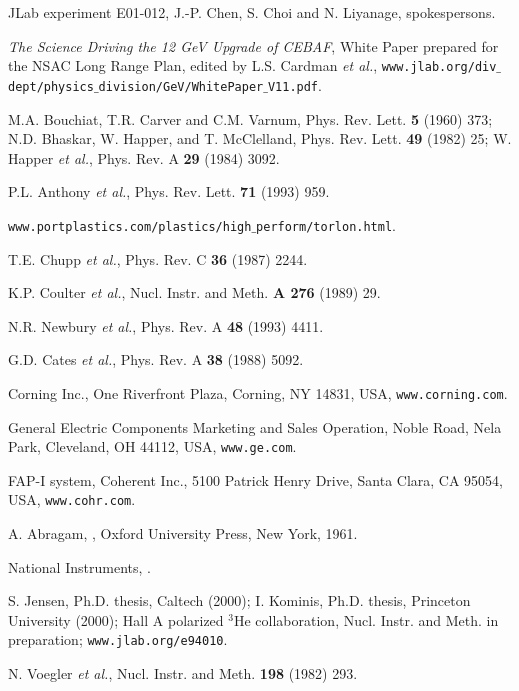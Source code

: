 \begin{thebibliography}{99}
 JLab experiment E01-012,
\newblock J.-P. Chen, S. Choi and N. Liyanage, spokespersons.

 {\it The Science Driving the 12 GeV Upgrade of CEBAF},
\newblock White Paper prepared for the NSAC Long Range Plan, edited by L.S. 
Cardman {\em et al.}, {\tt www.jlab.org/div$\_$dept/physics$\_$division/GeV/WhitePaper$\_$V11.pdf}.

 M.A. Bouchiat, T.R. Carver and C.M. Varnum,
\newblock Phys. Rev. Lett. {\bf 5} (1960) 373; N.D. Bhaskar, W. Happer, and T. McClelland, 
Phys. Rev. Lett. {\bf 49} (1982) 25;
W. Happer {\it et al.}, Phys. Rev. A {\bf 29} (1984) 3092.

 P.L. Anthony {\em et al.},
\newblock Phys. Rev. Lett. {\bf 71} (1993) 959.

{\tt www.portplastics.com/plastics/high$\_$perform/torlon.html}.

 T.E. Chupp {\em et al.}, 
\newblock Phys. Rev. C {\bf 36} (1987) 2244.

 K.P. Coulter {\em et al.},
\newblock  Nucl. Instr. and Meth.  {\bf A 276} (1989) 29.

 N.R. Newbury {\em et al.},
\newblock  Phys. Rev. A {\bf 48} (1993) 4411.

 G.D. Cates {\em et al.},
\newblock Phys. Rev. A {\bf 38} (1988) 5092.

 Corning Inc.,
\newblock One Riverfront Plaza, Corning, NY 14831, USA, {\tt www.corning.com}.

 General Electric Components Marketing and Sales Operation,
 Noble Road, Nela Park, Cleveland, OH 44112, USA, {\tt www.ge.com}.

 FAP-I system,
\newblock Coherent Inc., 5100 Patrick Henry Drive, Santa Clara, CA 95054, USA, {\tt www.cohr.com}.

 A. Abragam,
, 
Oxford University Press, New York, 1961.

 National Instruments, 
.

S. Jensen,
\newblock Ph.D. thesis, Caltech (2000); I. Kominis, Ph.D. thesis, 
Princeton University (2000); Hall A polarized $^3$He collaboration, Nucl. 
Instr. and Meth. in preparation; {\tt www.jlab.org/e94010}.

 N. Voegler {\em et al.},
\newblock Nucl. Instr. and Meth. {\bf 198} (1982) 
293.


\end{thebibliography}
